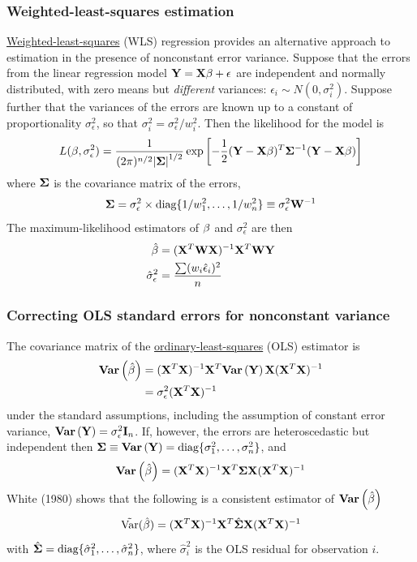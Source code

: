\subsubsection*{Weighted-least-squares estimation}

\underline{Weighted-least-squares} (WLS) regression provides an alternative approach to estimation in the presence of nonconstant error variance.
Suppose that the errors from the linear regression model $\mathbf{Y} = \mathbf{X\beta} + \mathbf{\epsilon}$ are independent and normally distributed, with zero means but {\it different} variances:
$\epsilon_i \sim N(0, \sigma^2_i)$.
Suppose further that the variances of the errors are known up to a constant of proportionality $\sigma_\epsilon^2$, so that $\sigma_i^2 = \sigma_\epsilon^2/w_i^2$.
Then the likelihood for the model is
$$
L(\beta, \sigma_\epsilon^2) = \frac{1}{(2\pi)^{n/2} |\mathbf{\Sigma|}^{1/2}}\exp\left[ -\frac{1}{2}(\mathbf{Y} - \mathbf{X\beta})^T \mathbf{\Sigma}^{-1} (\mathbf{Y} - \mathbf{X\beta}) \right]
$$
where $\mathbf{\Sigma}$ is the covariance matrix of the errors,
$$
\mathbf{\Sigma} = \sigma_\epsilon^2 \times \mbox{diag}\{1/w_1^2, \dots, 1/w_n^2\} \equiv \sigma_\epsilon^2 \mathbf{W}^{-1}
$$
The maximum-likelihood estimators of $\mathbf{\beta}$ and $\sigma_\epsilon^2$ are then
$$
\begin{aligned}
\hat{\mathbf{\beta}} &= (\mathbf{X}^T \mathbf{WX}) ^ {-1} \mathbf{X}^T \mathbf{WY}\\
\hat{\sigma}_\epsilon^2 &= \frac{\sum(w_i\hat{\epsilon}_i)^2}{n}\\
\end{aligned}
$$

\subsubsection*{Correcting OLS standard errors for nonconstant variance}
The covariance matrix of the \underline{ordinary-least-squares} (OLS) estimator is
$$
\begin{aligned}
\mathbf{Var}\left(\hat{\beta}\right) &= (\mathbf{X}^T \mathbf{X})^{-1} \mathbf{X}^T \mathbf{Var}\left(\mathbf{Y}\right) \mathbf{X} (\mathbf{X}^T \mathbf{X})^{-1}\\
&= \sigma_\epsilon^2  (\mathbf{X}^T \mathbf{X})^{-1} \\
\end{aligned}
$$
under the standard assumptions, including the assumption of constant error variance, $\mathbf{Var}\left(\mathbf{Y}\right) = \sigma_\epsilon^2\mathbf{I}_n$.
If, however, the errors are heteroscedastic but independent then $\mathbf{\Sigma} \equiv \mathbf{Var}\left(\mathbf{Y}\right) = \mbox{diag}\{\sigma_1^2, \dots, \sigma_n^2 \}$, and 
$$
\mathbf{Var}\left(\hat{\beta}\right) = (\mathbf{X}^T \mathbf{X})^{-1} \mathbf{X}^T \mathbf{\Sigma} \mathbf{X} (\mathbf{X}^T \mathbf{X})^{-1}
$$
White (1980) shows that the following is a consistent estimator of $\mathbf{Var}\left(\hat{\beta}\right)$
$$
\tilde{\rm Var}(\hat{\mathbf{\beta}}) = (\mathbf{X}^T \mathbf{X})^{-1} \mathbf{X}^T \hat{\mathbf{\Sigma}} \mathbf{X} (\mathbf{X}^T \mathbf{X})^{-1}
$$
with $\hat{\mathbf{\Sigma}} = \mbox{diag}\{\hat{\sigma}_1^2, \dots, \hat{\sigma}_n^2\}$, where $\hat{\sigma}_i^2$ is the OLS residual for observation $i$.

